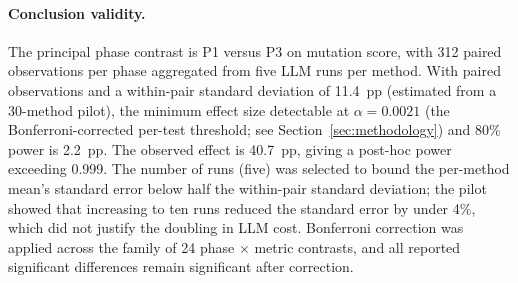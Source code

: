 \paragraph{Conclusion validity.} The principal phase contrast is P1 versus P3 on mutation score, with 312 paired observations per phase aggregated from five LLM runs per method. With paired observations and a within-pair standard deviation of 11.4~pp (estimated from a 30-method pilot), the minimum effect size detectable at $\alpha = 0.0021$ (the Bonferroni-corrected per-test threshold; see Section~\ref{sec:methodology}) and 80\% power is 2.2~pp. The observed effect is 40.7~pp, giving a post-hoc power exceeding 0.999. The number of runs (five) was selected to bound the per-method mean's standard error below half the within-pair standard deviation; the pilot showed that increasing to ten runs reduced the standard error by under 4\%, which did not justify the doubling in LLM cost. Bonferroni correction was applied across the family of 24 phase $\times$ metric contrasts, and all reported significant differences remain significant after correction.
